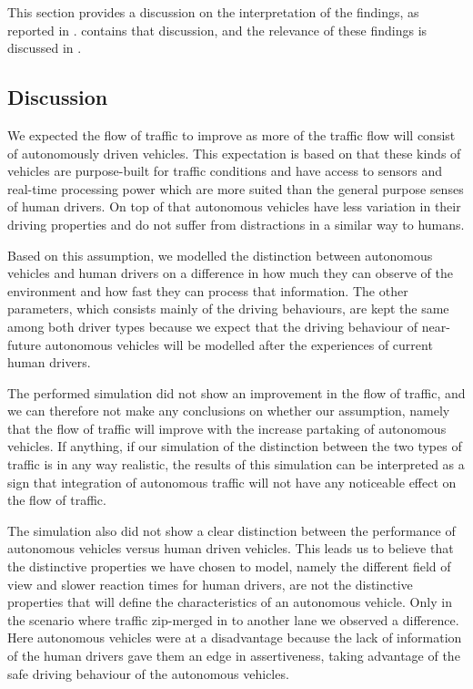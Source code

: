

This section provides a discussion on the interpretation of the findings, as reported in .  contains that discussion, and the relevance of these findings is discussed in .

\subsection{Discussion}
\label{sub:conclusion:discussion}
We expected the flow of traffic to improve as more of the traffic flow will consist of autonomously driven vehicles. This expectation is based on that these kinds of vehicles are purpose-built for traffic conditions and have access to sensors and real-time processing power which are more suited than the general purpose senses of human drivers. On top of that autonomous vehicles have less variation in their driving properties and do not suffer from distractions in a similar way to humans.

Based on this assumption, we modelled the distinction between autonomous vehicles and human drivers on a difference in how much they can observe of the environment and how fast they can process that information. The other parameters, which consists mainly of the driving behaviours, are kept the same among both driver types because we expect that the driving behaviour of near-future autonomous vehicles will be modelled after the experiences of current human drivers.

The performed simulation did not show an improvement in the flow of traffic, and we can therefore not make any conclusions on whether our assumption, namely that the flow of traffic will improve with the increase partaking of autonomous vehicles. If anything, if our simulation of the distinction between the two types of traffic is in any way realistic, the results of this simulation can be interpreted as a sign that integration of autonomous traffic will not have any noticeable effect on the flow of traffic.

The simulation also did not show a clear distinction between the performance of autonomous vehicles versus human driven vehicles. This leads us to believe that the distinctive properties we have chosen to model, namely the different field of view and slower reaction times for human drivers, are not the distinctive properties that will define the characteristics of an autonomous vehicle. Only in the scenario where traffic zip-merged in to another lane we observed a difference. Here autonomous vehicles were at a disadvantage because the lack of information of the human drivers gave them an edge in assertiveness, taking advantage of the safe driving behaviour of the autonomous vehicles.

